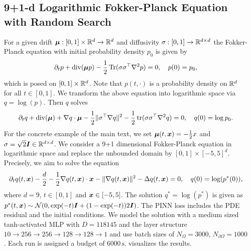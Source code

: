 \subsection{9+1-d Logarithmic Fokker-Planck Equation with Random Search}\label{sec:fokker10d-appendix}
For a given drift ${\bm{\mu}}: [0, 1]\times {\mathbb{R}}^d \to {\mathbb{R}}^d$ and diffusivity $\sigma:[0,1]\to{\mathbb{R}}^{d\times d}$
the Fokker-Planck equation with initial probability density $p_0$ is given by
\begin{equation*}
  \partial_t p
  +
  \operatorname{div}({\bm{\mu}} p)
  -
  \frac12\operatorname{Tr}(\sigma \sigma^\top \nabla^2 p)
  =
  0,
  \quad
  p(0)
  =
  p_0,
\end{equation*}
which is posed on $[0, 1]\times {\mathbb{R}}^d$.
Note that $p(t,\cdot)$ is a probability density on ${\mathbb{R}}^d$ for all $t\in[0,1]$. We transform the above equation into logarithmic
space via $q=\log(p)$. Then $q$ solves
\begin{equation*}
  \partial_t q
  +
  \operatorname{div}({\bm{\mu}})
  +
  \nabla q \cdot {\bm{\mu}}
  -
  \frac12 \|\sigma^\top \nabla q\|^2
  -
  \frac12\operatorname{tr}(\sigma\sigma^\top\nabla^2q)
  =
  0,
  \quad
  q(0)
  =
  \log p_0.
\end{equation*}
For the concrete example of the main text, we set ${\bm{\mu}}(t, {\bm{x}})=-\frac12x$ and $\sigma = \sqrt{2}{\bm{I}} \in {\mathbb{R}}^{d\times d}$.
We consider a 9+1 dimensional Fokker-Planck equation in logarithmic space and replace the unbounded
domain by $[0, 1]\times [-5, 5]^d$. Precisely, we aim to solve the
equation
\begin{equation*}
  \partial_t q(t, {\bm{x}})
  -
  \frac{d}{2}
  -
  \frac12 \nabla q(t, {\bm{x}})\cdot {\bm{x}}
  -
  \| \nabla q(t, {\bm{x}}) \|^2
  -
  \Delta q(t, {\bm{x}})
  =
  0,
  \quad
  q(0) = \log (p^*(0)),
\end{equation*}
where $d=9$, $t\in[0, 1]$ and ${\bm{x}}\in[-5, 5]$. The solution $q^*=\log(p^*)$ is
given as $p^*(t, {\bm{x}}) \sim \mathcal N (0, \exp(-t){\bm{I}} + (1-\exp(-t))2{\bm{I}})$.
The PINN loss includes the PDE residual and the initial conditions.
We model the solution with a medium sized tanh-activated
MLP with $D=\num{118145}$ and the layer structure
$10 \to 256 \to 256 \to 128 \to 128 \to 1$ and use batch sizes of
$N_{\Omega} = \num{3000}$, $N_{\partial\Omega} = \num{1000}$. Each run is
assigned a budget of $\num{6000}\,\text{s}$.  visualizes the results.

